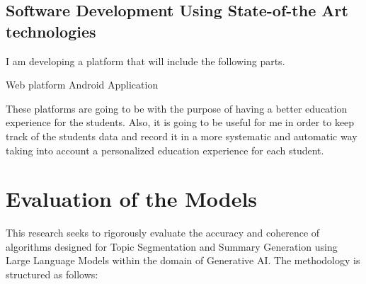 \subsection{Software Development Using State-of-the Art technologies}



I am developing a platform that will include the following parts.

Web platform
Android Application

These platforms are going to be with the purpose of having a better education experience for the students. Also, it is going to be useful for me in order to keep track of the students data and record it in a more systematic and automatic way taking into account a personalized education experience for each student.


 
\section{Evaluation of the Models}


This research seeks to rigorously evaluate the accuracy and coherence of algorithms designed for Topic Segmentation and Summary Generation using Large Language Models within the domain of Generative AI. The methodology is structured as follows:

